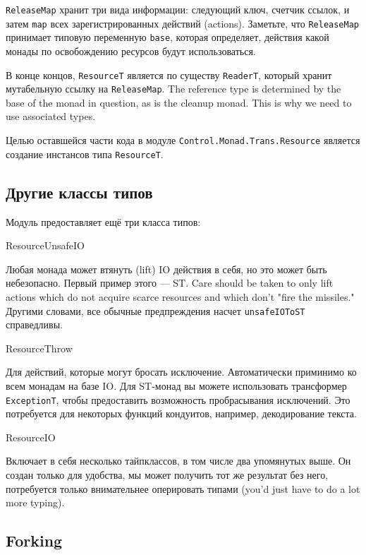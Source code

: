 \lstinline'ReleaseMap' хранит три вида информации: следующий ключ, счетчик ссылок, и затем
\lstinline'map' всех
зарегистрированных действий (actions). Заметьте, что \lstinline'ReleaseMap' принимает
типовую переменную \lstinline'base', которая определяет, действия какой монады по
освобождению ресурсов  будут использоваться.

В конце концов, \lstinline'ResourceT' является по существу \lstinline'ReaderT', который
хранит мутабельную
ссылку на \lstinline'ReleaseMap'. The reference type is determined by the base
of the monad in question, as is the cleanup monad. This is why we need to use associated
types.

Целью оставшейся части кода в модуле \lstinline'Control.Monad.Trans.Resource'
является создание инстансов типа \lstinline'ResourceT'.

\subsection{Другие классы типов}

Модуль предоставляет ещё три класса типов:
   
ResourceUnsafeIO

Любая монада может втянуть (lift) IO действия в себя, но это может быть небезопасно.
Первый пример этого --- ST. Care should be taken to
only lift actions which do not acquire scarce resources and which don't "fire the
missiles." Другими словами, все обычные предпреждения насчет \lstinline'unsafeIOToST'
справедливы.
  
ResourceThrow

Для действий, которые могут бросать исключение. Автоматически приминимо ко всем
монадам на базе IO. Для ST-монад вы можете использовать трансформер
\lstinline'ExceptionT', чтобы
предоставить возможность пробрасывания исключений. Это потребуется для некоторых функций
кондуитов, например, декодирование текста.
   
ResourceIO

Включает в себя несколько тайпклассов, в том числе два
упомянутых выше. Он создан только для удобства, мы может получить тот же результат без
него, потребуется только внимательнее оперировать типами (you'd just have to do a lot
more typing).
   
\subsection{Forking}

